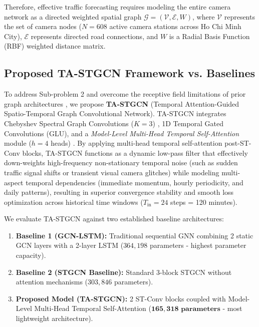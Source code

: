 Therefore, effective traffic forecasting requires modeling the entire camera network as a directed weighted spatial graph $\mathcal{G} = (\mathcal{V}, \mathcal{E}, W)$, where $\mathcal{V}$ represents the set of camera nodes ($N=608$ active camera stations across Ho Chi Minh City), $\mathcal{E}$ represents directed road connections, and $W$ is a Radial Basis Function (RBF) weighted distance matrix.

\subsection{Proposed TA-STGCN Framework vs. Baselines}
To address Sub-problem 2 and overcome the receptive field limitations of prior graph architectures \cite{stgcn, astgcn, stsgcn}, we propose \textbf{TA-STGCN} (Temporal Attention-Guided Spatio-Temporal Graph Convolutional Network). TA-STGCN integrates Chebyshev Spectral Graph Convolutions ($K=3$) \cite{chebnet}, 1D Temporal Gated Convolutions (GLU), and a \emph{Model-Level Multi-Head Temporal Self-Attention} module ($h=4$ heads) \cite{attention}. By applying multi-head temporal self-attention post-ST-Conv blocks, TA-STGCN functions as a dynamic low-pass filter that effectively down-weights high-frequency non-stationary temporal noise (such as sudden traffic signal shifts or transient visual camera glitches) while modeling multi-aspect temporal dependencies (immediate momentum, hourly periodicity, and daily patterns), resulting in superior convergence stability and smooth loss optimization across historical time windows ($T_{\text{in}} = 24$ steps = 120 minutes).

We evaluate TA-STGCN against two established baseline architectures:
\begin{enumerate}
    \item \textbf{Baseline 1 (GCN-LSTM):} Traditional sequential GNN combining 2 static GCN layers \cite{gcn} with a 2-layer LSTM ($364,198$ parameters - highest parameter capacity).
    \item \textbf{Baseline 2 (STGCN Baseline):} Standard 3-block STGCN \cite{stgcn} without attention mechanisms ($303,846$ parameters).
    \item \textbf{Proposed Model (TA-STGCN):} 2 ST-Conv blocks coupled with Model-Level Multi-Head Temporal Self-Attention \cite{attention} ($\mathbf{165,318 \text{ parameters}}$ - most lightweight architecture).
\end{enumerate}

